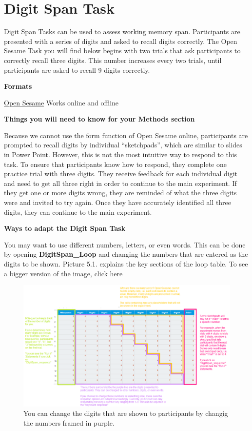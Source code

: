 \documentclass[
]{book}
\begin{document}
\hypertarget{digit-span-task}{%
\section{Digit Span Task}\label{digit-span-task}}

Digit Span Tasks can be used to assess working memory span. Participants are presented with a series of digits and asked to recall digits correctly. The Open Sesame Task you will find below begins with two trials that ask participants to correctly recall three digits. This number increases every two trials, until participants are asked to recall 9 digits correctly.

\textbf{Formats}

\href{link\%20here}{Open Sesame} Works online and offline

\textbf{Things you will need to know for your Methods section}

Because we cannot use the form function of Open Sesame online, participants are prompted to recall digits by individual ``sketchpads'', which are similar to slides in Power Point. However, this is not the most intuitive way to respond to this task. To ensure that participants know how to respond, they complete one practice trial with three digits. They receive feedback for each individual digit and need to get all three right in order to continue to the main experiment. If they get one or more digits wrong, they are reminded of what the three digits were and invited to try again. Once they have accurately identified all three digits, they can continue to the main experiment.

\textbf{Ways to adapt the Digit Span Task}

You may want to use different numbers, letters, or even words. This can be done by opening \textbf{DigitSpan\_Loop} and changing the numbers that are entered as the digits to be shown. Picture 5.1. explains the key sections of the loop table. To see a bigger version of the image, \href{'/images/ChangeDigitSpan.png'}{click here}

\begin{figure}

{\centering \includegraphics[width=0.99\linewidth]{images/ChangeDigitSpan} 

}

\caption{You can change the digits that are shown to participants by changig the numbers framed in purple.}\label{fig:Figure2-1}
\end{figure}
\end{document}
